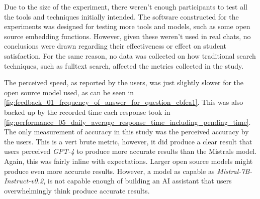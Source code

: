 

Due to the size of the experiment, there weren't enough participants to test all the tools and techniques initially intended. The software constructed for the experiments was designed for testing more tools and models, such as some open source embedding functions. However, given these weren’t used in real chats, no conclusions were drawn regarding their effectiveness or effect on student satisfaction. For the same reason, no data was collected on how traditional search techniques, such as fulltext search, affected the metrics collected in the study.




The perceived speed, as reported by the users, was just slightly slower for the open source model used, as can be seen in \autoref{fig:feedback_01_frequency_of_answer_for_question_cbfea1}. This was also backed up by the recorded time each response took in \autoref{fig:performance_05_daily_average_response_time_including_pending_time}. The only measurement of accuracy in this study was the perceived accuracy by the users. This is a vert brute metric, however, it did produce a clear result that users perceived \textit{GPT-4} to produce more accurate results than the Mistrals model. Again, this was fairly inline with expectations. Larger open source models might produce even more accurate results. However, a model as capable as \textit{Mistral-7B-Instruct-v0.2}, is not capable enough of building an AI assistant that users overwhelmingly think produce accurate results.














